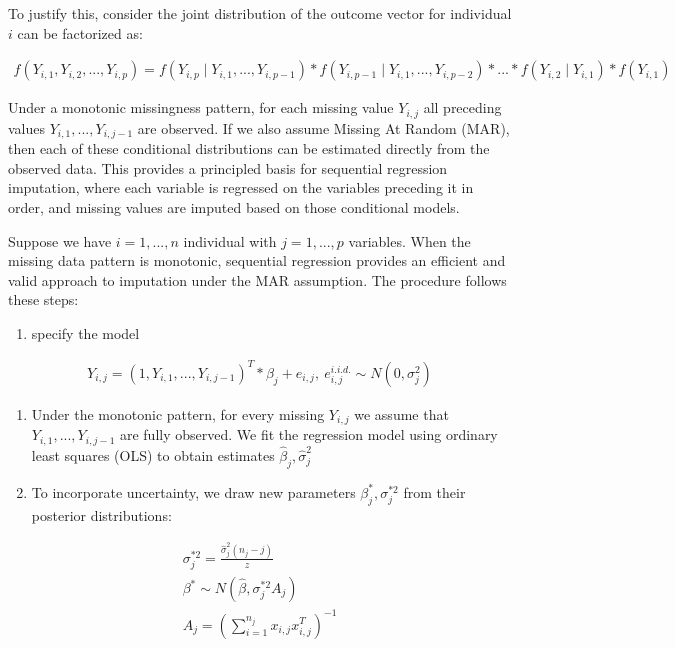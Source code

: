 \documentclass{article}
\providecommand{\tightlist}{%
  \setlength{\itemsep}{0pt}\setlength{\parskip}{0pt}}
\begin{document}
To justify this, consider the joint distribution of the outcome vector
for individual \(i\) can be factorized as:

\begin{align*}
    f(Y_{i,1},Y_{i,2},...,Y_{i,p}) = f(Y_{i,p} \mid Y_{i,1},...,Y_{i,p-1}) * 
    f(Y_{i,p-1} \mid Y_{i,1},...,Y_{i,p-2}) * ... * f(Y_{i,2} \mid Y_{i,1}) 
    * f(Y_{i,1})
    \end{align*}

Under a monotonic missingness pattern, for each missing value
\(Y_{i,j}\) all preceding values \(Y_{i,1},...,Y_{i,j-1}\) are observed.
If we also assume Missing At Random (MAR), then each of these
conditional distributions can be estimated directly from the observed
data. This provides a principled basis for sequential regression
imputation, where each variable is regressed on the variables preceding
it in order, and missing values are imputed based on those conditional
models.

Suppose we have \(i=1,...,n\) individual with \(j=1,...,p\) variables.
When the missing data pattern is monotonic, sequential regression
provides an efficient and valid approach to imputation under the MAR
assumption. The procedure follows these steps:

\begin{enumerate}
\def\labelenumi{\arabic{enumi}.}
\tightlist
\item
  specify the model
\end{enumerate}

\begin{align*}    
    Y_{i,j} = (1,Y_{i,1},...,Y_{i,j-1})^{T} * \beta_{j} + 
    e_{i,j},\ {e_{i,j}^{i.i.d.} \sim{N} (0,\sigma^{2}_{j})}
    \end{align*}

\begin{enumerate}
\def\labelenumi{\arabic{enumi}.}
\setcounter{enumi}{1}
\item
  Under the monotonic pattern, for every missing \(Y_{i,j}\) we assume
  that \(Y_{i,1},...,Y_{i,j-1}\) are fully observed. We fit the
  regression model using ordinary least squares (OLS) to obtain
  estimates \(\hat{\beta}_{j},\hat{\sigma}_{j}^{2}\)
\item
  To incorporate uncertainty, we draw new parameters
  \(\beta_{j}^{*},\sigma_{j}^{*2}\) from their posterior distributions:
\end{enumerate}

\begin{align*}
   \sigma_j^{*2} = \frac{\hat{\sigma}_j^2 (n_j - j)}{z} \\
   \beta^* \sim N(\hat{\beta}, \sigma_j^{*2} A_j) \\
   A_j = (\sum_{i=1}^{n_j} x_{i,j} x_{i,j}^T)^{-1}
   \end{align*}
\end{document}
